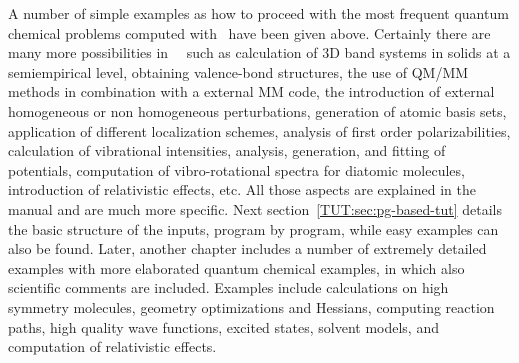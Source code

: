 A number of simple examples as how to proceed with the most frequent 
quantum chemical problems computed with \molcas\ have been given above. Certainly there are many more
possibilities in \molcas\ \molcasversion\, such as calculation of 3D band
systems in solids at a semiempirical level, obtaining valence-bond structures,
the use of QM/MM methods in combination with a external MM code, the introduction
of external homogeneous or non homogeneous perturbations, generation of atomic
basis sets, application of different localization schemes, analysis of first
order polarizabilities, calculation of vibrational intensities, analysis, generation,
and fitting of potentials, computation of vibro-rotational spectra for diatomic
molecules, introduction of relativistic effects, etc. All those aspects are
explained in the manual and are much more specific. Next section~\ref{TUT:sec:pg-based-tut}
details the basic structure of the inputs, program by program, while easy examples
can also be found. Later, another chapter includes a number of extremely detailed
examples with more elaborated quantum chemical examples, in which also scientific
comments are included. Examples include calculations on high symmetry molecules,
geometry optimizations and Hessians, computing reaction paths, high quality wave
functions, excited states, solvent models, and computation of relativistic effects.

